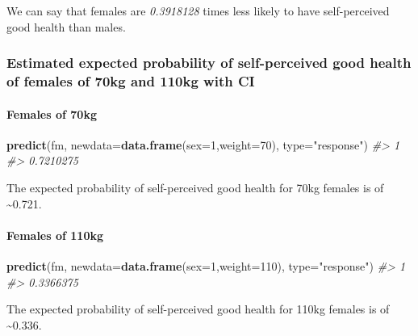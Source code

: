 \documentclass[]{article}
\newenvironment{Shaded}{\begin{snugshade}}{\end{snugshade}}
\newcommand{\CommentTok}[1]{\textcolor[rgb]{0.56,0.35,0.01}{\textit{#1}}}
\newcommand{\DataTypeTok}[1]{\textcolor[rgb]{0.13,0.29,0.53}{#1}}
\newcommand{\DecValTok}[1]{\textcolor[rgb]{0.00,0.00,0.81}{#1}}
\newcommand{\KeywordTok}[1]{\textcolor[rgb]{0.13,0.29,0.53}{\textbf{#1}}}
\newcommand{\NormalTok}[1]{#1}
\newcommand{\StringTok}[1]{\textcolor[rgb]{0.31,0.60,0.02}{#1}}
\let\oldparagraph\paragraph
\renewcommand{\paragraph}[1]{\oldparagraph{#1}\mbox{}}
\begin{document}
We can say that females are \emph{0.3918128} times less likely to have
self-perceived good health than males.

\hypertarget{estimated-expected-probability-of-self-perceived-good-health-of-females-of-70kg-and-110kg-with-ci}{%
\subsubsection{Estimated expected probability of self-perceived good
health of females of 70kg and 110kg with
CI}\label{estimated-expected-probability-of-self-perceived-good-health-of-females-of-70kg-and-110kg-with-ci}}

\hypertarget{females-of-70kg}{%
\paragraph{Females of 70kg}\label{females-of-70kg}}

\begin{Shaded}
\begin{Highlighting}[]
\KeywordTok{predict}\NormalTok{(fm, }\DataTypeTok{newdata=}\KeywordTok{data.frame}\NormalTok{(}\DataTypeTok{sex=}\DecValTok{1}\NormalTok{,}\DataTypeTok{weight=}\DecValTok{70}\NormalTok{), }\DataTypeTok{type=}\StringTok{"response"}\NormalTok{)}
\CommentTok{#>         1 }
\CommentTok{#> 0.7210275}
\end{Highlighting}
\end{Shaded}

The expected probability of self-perceived good health for 70kg females
is of \textasciitilde{}0.721.

\hypertarget{females-of-110kg}{%
\paragraph{Females of 110kg}\label{females-of-110kg}}

\begin{Shaded}
\begin{Highlighting}[]
\KeywordTok{predict}\NormalTok{(fm, }\DataTypeTok{newdata=}\KeywordTok{data.frame}\NormalTok{(}\DataTypeTok{sex=}\DecValTok{1}\NormalTok{,}\DataTypeTok{weight=}\DecValTok{110}\NormalTok{), }\DataTypeTok{type=}\StringTok{"response"}\NormalTok{)}
\CommentTok{#>         1 }
\CommentTok{#> 0.3366375}
\end{Highlighting}
\end{Shaded}

The expected probability of self-perceived good health for 110kg females
is of \textasciitilde{}0.336.
\end{document}
